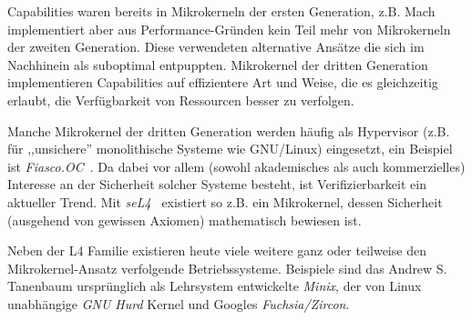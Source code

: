 Capabilities waren bereits in Mikrokerneln der ersten Generation, z.B. Mach
implementiert aber aus Performance-Gründen kein Teil mehr von Mikrokerneln der
zweiten Generation.  Diese verwendeten alternative Ansätze die sich im
Nachhinein als suboptimal entpuppten. Mikrokernel der dritten Generation
implementieren Capabilities auf effizientere Art und Weise, die es gleichzeitig
erlaubt, die Verfügbarkeit von Ressourcen besser zu verfolgen.

Manche Mikrokernel der dritten Generation werden häufig als Hypervisor (z.B.
für ,,unsichere'' monolithische Systeme wie GNU/Linux) eingesetzt, ein Beispiel
ist \textit{Fiasco.OC}~\cite{fiasco}. Da dabei vor allem (sowohl akademisches
als auch kommerzielles) Interesse an der Sicherheit solcher Systeme besteht,
ist Verifizierbarkeit ein aktueller Trend. Mit \textit{seL4}~\cite{sel4}
existiert so z.B. ein Mikrokernel, dessen Sicherheit (ausgehend von gewissen
Axiomen) mathematisch bewiesen ist.

Neben der L4 Familie existieren heute viele weitere ganz oder teilweise den
Mikrokernel-Ansatz verfolgende Betriebssysteme. Beispiele sind das Andrew S.
Tanenbaum ursprünglich als Lehrsystem entwickelte \textit{Minix}, der von
Linux unabhängige \textit{GNU Hurd} Kernel und Googles \textit{Fuchsia/Zircon}.
